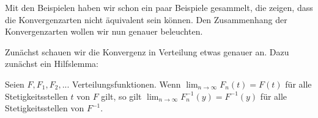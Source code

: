 Mit den Beispielen haben wir schon ein paar Beispiele gesammelt, die zeigen, dass die Konvergenzarten nicht \"aquivalent sein k\"onnen. Den Zusammenhang der Konvergenzarten wollen wir nun genauer beleuchten.\smallskip

	\marginpar{\textcolor{red}{Vorlesung 25}}
Zun\"achst schauen wir die Konvergenz in Verteilung etwas genauer an. Dazu zun\"achst ein Hilfslemma:
\begin{lemma}\label{Stet}
	Seien $F,F_1,F_2,...$ Verteilungsfunktionen. Wenn $\lim_{n\to\infty} F_n(t) = F(t)$ für alle Stetigkeitsstellen $t$ von $F$ gilt, so gilt $\lim_{n\to\infty} F_n^{-1}(y) = F^{-1}(y)$ für alle Stetigkeitsstellen von $F^{-1}$.
\end{lemma}


